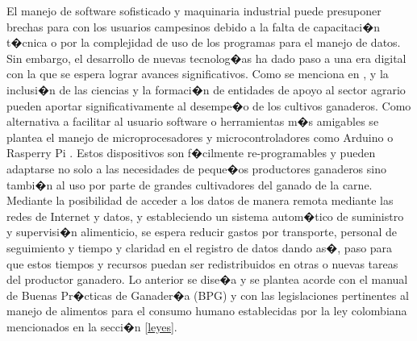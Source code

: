 El manejo de software sofisticado y maquinaria industrial puede presuponer brechas para con los usuarios campesinos debido a la falta de capacitaci�n t�cnica o por la complejidad de uso de los programas para el manejo de datos. Sin embargo, el desarrollo de nuevas tecnolog�as ha dado paso a una era digital con la que se espera lograr avances significativos. Como se menciona en \cite{minagricultura}, \cite{ashby} y \cite{fao} la inclusi�n de las ciencias y la formaci�n de entidades de apoyo al sector agrario pueden aportar significativamente al desempe�o de los  cultivos ganaderos. 
Como alternativa a facilitar al usuario software o herramientas m�s amigables se plantea el manejo de microprocesadores y microcontroladores como Arduino o Rasperry Pi \cite{arduinodef}. Estos dispositivos son f�cilmente re-programables y pueden adaptarse no solo a las necesidades de peque�os productores ganaderos sino tambi�n al uso por parte de grandes cultivadores del ganado de la carne.\\


Mediante la posibilidad de acceder a los datos de manera remota mediante las redes de Internet y datos, y estableciendo un sistema autom�tico de suministro y supervisi�n alimenticio, se espera reducir gastos por transporte, personal de seguimiento y tiempo  y claridad en el registro de datos dando as�, paso para que estos tiempos y recursos puedan ser redistribuidos en otras o nuevas tareas del productor ganadero.
Lo anterior se dise�a y se plantea acorde con el manual de Buenas Pr�cticas de Ganader�a  (BPG) y con las legislaciones pertinentes al manejo de alimentos para el consumo humano establecidas por la ley colombiana mencionados en la secci�n \ref{leyes}.


